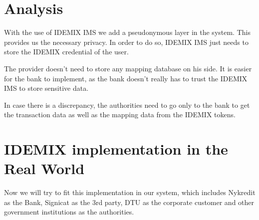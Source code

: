 \section{Analysis}
With the use of IDEMIX IMS we add a pseudonymous layer in the system. This provides us the necessary privacy. In order to do so, IDEMIX IMS just needs to store the IDEMIX credential of the user. 

The provider doesn’t need to store any mapping database on his side. It is easier for the  bank to implement, as the bank doesn’t really has to trust the IDEMIX IMS to store sensitive data.

In case there is a discrepancy, the authorities need to go only to the bank to get the transaction data as well as the mapping data from the IDEMIX tokens.
\section {IDEMIX implementation in the Real World}
Now we will try to fit this implementation in our system, which includes Nykredit as the Bank, Signicat as the 3rd party, DTU as the corporate customer and other government institutions as the authorities.
